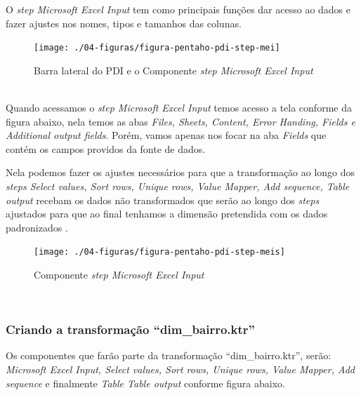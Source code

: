 O \textit{step Microsoft Excel Input} tem como principais fun\c{c}\~{o}es dar acesso ao dados e fazer ajustes nos nomes, tipos e tamanhos das colunas.

\begin{figure}[H]
	\vspace*{0,2cm}
    \centering
    \caption{Barra lateral do PDI e o Componente \textit{step Microsoft Excel Input}}
    \texttt{[image: ./04-figuras/figura-pentaho-pdi-step-mei]}
    \label{fig:ilustfigpentahopdistepmei}
\end{figure}
\vspace*{-0,9cm}
{\raggedright {}} \\

Quando acessamos o \textit{step Microsoft Excel Input} temos acesso a tela conforme da figura abaixo, nela temos as abas \textit{Files, Sheets, Content, Error Handing, Fields e Additional output fields}. Por\'{e}m, vamos apenas nos focar na aba \textit{Fields} que cont\'{e}m os campos providos da fonte de dados. 

Nela podemos fazer os ajustes necess\'{a}rios para que a transforma\c{c}\~{a}o ao longo dos \textit{steps Select values, Sort rows, Unique rows, Value Mapper, Add sequence, Table output} recebam os dados n\~{a}o transformados que ser\~{a}o ao longo dos \textit{steps} ajustados para que ao final tenhamos a dimens\~{a}o pretendida com os dados padronizados .

\begin{figure}[H]
	\vspace*{0,2cm}
    \centering
    \caption{Componente \textit{step Microsoft Excel Input}}
    \texttt{[image: ./04-figuras/figura-pentaho-pdi-step-meis]}
    \label{fig:ilustfigpentahopdistepmeis}
\end{figure}
\vspace*{-0,9cm}
{\raggedright {}} \\


\subsubsection{Criando a transforma\c{c}\~{a}o ``dim\_bairro.ktr''}

Os componentes que far\~{a}o parte da transforma\c{c}\~{a}o ``dim\_bairro.ktr'', ser\~{a}o: \textit{Microsoft Excel Input, Select values, Sort rows, Unique rows, Value Mapper, Add sequence} e finalmente \textit{Table Table output} conforme figura abaixo.


